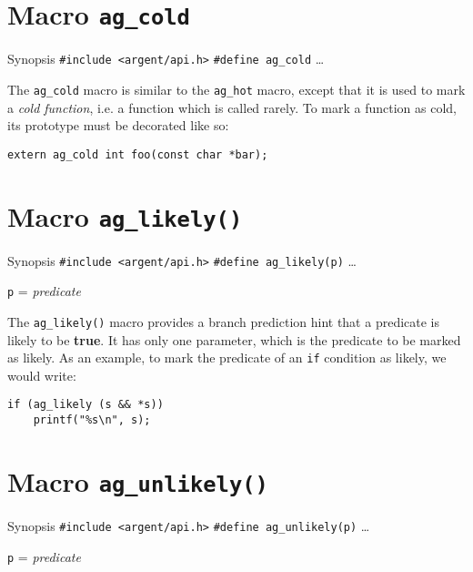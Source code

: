 \section{Macro \texttt{ag\_cold}}

\begin{bclogo}[logo=\bccrayon, noborder=true, barre=snake, couleurBarre=gray]
    {Synopsis}
  \verb|#include <argent/api.h>|
  \verb|#define ag_cold| \ldots
\end{bclogo}

The \verb|ag_cold| macro is similar to the \verb|ag_hot| macro, except
that it is used to mark a \emph{cold function}, i.e. a function which is called
rarely. To mark a function as cold, its prototype must be decorated like so:
\begin{lstlisting}[linewidth=1.0\linewidth]
extern ag_cold int foo(const char *bar);
\end{lstlisting}



\section{Macro \texttt{ag\_likely()}}

\begin{bclogo}[logo=\bccrayon, noborder=true, barre=snake, couleurBarre=gray]
    {Synopsis}
  \verb|#include <argent/api.h>|
  \verb|#define ag_likely(p)| \ldots
  \par
  \texttt{p} = \emph{predicate}
\end{bclogo}

The \verb|ag_likely()| macro provides a branch prediction hint that a predicate
is likely to be \textbf{true}. It has only one parameter, which is the predicate 
to be marked as likely. As an example, to mark the predicate of an \verb|if| 
condition as likely, we would write:
\begin{lstlisting}[linewidth=1.0\linewidth]
if (ag_likely (s && *s)) 
    printf("%s\n", s);
\end{lstlisting}



\section{Macro \texttt{ag\_unlikely()}}

\begin{bclogo}[logo=\bccrayon, noborder=true, barre=snake, couleurBarre=gray]
    {Synopsis}
  \verb|#include <argent/api.h>|
  \verb|#define ag_unlikely(p)| \ldots
  \par
  \texttt{p} = \emph{predicate}
\end{bclogo}

